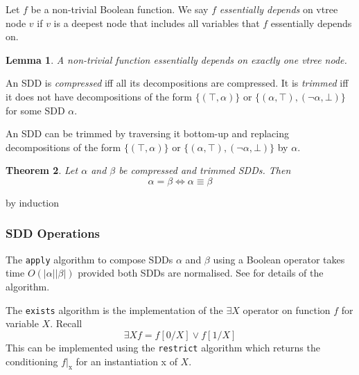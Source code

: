 \documentclass[12]{article}
\newtheorem{theorem}{Theorem}[section]
\newtheorem{lemma}[theorem]{Lemma}
\newenvironment{proof}[1][Proof]{\begin{trivlist}
\item[\hskip \labelsep {\bfseries #1}]}{\end{trivlist}}
\newenvironment{definition}[1][Definition]{\begin{trivlist}
\item[\hskip \labelsep {\bfseries #1}]}{\end{trivlist}}
\begin{document}
\begin{definition}
Let $f$ be a non-trivial Boolean function. We say $f$ \textit{essentially depends} on vtree node $v$ if $v$ is a deepest node that includes all variables that $f$ essentially depends on. 
\end{definition}

\begin{lemma}
A non-trivial function essentially depends on exactly one vtree node.
\end{lemma} 

\begin{proof} 

\end{proof}
 
\begin{definition}
An SDD is \textit{compressed} iff all its decompositions are compressed. It is \textit{trimmed} iff it does not have decompositions of the form $\{(\top, \alpha)\}$ or $\{(\alpha, \top), (\lnot\alpha, \bot)\}$ for some SDD $\alpha$.
\end{definition}

An SDD can be trimmed by traversing it bottom-up and replacing decompositions of the form  $\{(\top, \alpha)\}$ or $\{(\alpha, \top), (\lnot\alpha, \bot)\}$ by $\alpha$.

\begin{theorem} 
Let $\alpha$ and $\beta$ be compressed and trimmed SDDs. Then $$\alpha = \beta \Leftrightarrow \alpha \equiv \beta$$
\end{theorem}

\begin{proof}
by induction
\end{proof}

\subsubsection{SDD Operations}

The \texttt{apply} algorithm to compose SDDs $\alpha$ and $\beta$ using a Boolean operator takes time $O(|\alpha||\beta|)$ provided both SDDs 
are normalised. See \cite{sdd_1} for details of the algorithm.

The \texttt{exists} algorithm is the implementation of the $\exists X$ operator on function $f$ for variable $X$. Recall $$\exists X f = f[0/X] \lor f[1/X]$$
This can be implemented using the \texttt{restrict} algorithm which returns the conditioning $f|_{\mbox{x}}$ for an instantiation x of $X$.  
\end{document}
